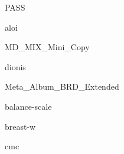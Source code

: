 \documentclass[sigconf,nonacm,screen]{acmart}
\begin{document}


  
        \begin{figure}[!ht]
            \centering
            
            \caption{PASS}
        \end{figure}  
    
  
        \begin{figure}[!ht]
            \centering
            
            \caption{aloi}
        \end{figure}  
    
  
        \begin{figure}[!ht]
            \centering
            
            \caption{MD\_MIX\_Mini\_Copy}
        \end{figure}  
    
  
        \begin{figure}[!ht]
            \centering
            
            \caption{dionis}
        \end{figure}  
    
  
        \begin{figure}[!ht]
            \centering
            
            \caption{Meta\_Album\_BRD\_Extended}
        \end{figure}  
    
  
        \begin{figure}[!ht]
            \centering
            
            \caption{balance-scale}
        \end{figure}  
    
  
        \begin{figure}[!ht]
            \centering
            
            \caption{breast-w}
        \end{figure}  
    
  
        \begin{figure}[!ht]
            \centering
            
            \caption{cmc}
        \end{figure}  
    
\end{document}
